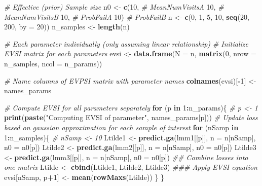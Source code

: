 \documentclass[
]{article}
\newenvironment{Shaded}{\begin{snugshade}}{\end{snugshade}}
\newcommand{\CommentTok}[1]{\textcolor[rgb]{0.56,0.35,0.01}{\textit{#1}}}
\newcommand{\ControlFlowTok}[1]{\textcolor[rgb]{0.13,0.29,0.53}{\textbf{#1}}}
\newcommand{\DataTypeTok}[1]{\textcolor[rgb]{0.13,0.29,0.53}{#1}}
\newcommand{\DecValTok}[1]{\textcolor[rgb]{0.00,0.00,0.81}{#1}}
\newcommand{\KeywordTok}[1]{\textcolor[rgb]{0.13,0.29,0.53}{\textbf{#1}}}
\newcommand{\NormalTok}[1]{#1}
\newcommand{\OperatorTok}[1]{\textcolor[rgb]{0.81,0.36,0.00}{\textbf{#1}}}
\newcommand{\StringTok}[1]{\textcolor[rgb]{0.31,0.60,0.02}{#1}}
\begin{document}
\begin{Shaded}
\begin{Highlighting}[]
\CommentTok{# Effective (prior) Sample size}
\NormalTok{n0 <-}\StringTok{ }\KeywordTok{c}\NormalTok{(}\DecValTok{10}\NormalTok{, }\CommentTok{# MeanNumVisitsA}
        \DecValTok{10}\NormalTok{, }\CommentTok{# MeanNumVisitsB}
        \DecValTok{10}\NormalTok{, }\CommentTok{# ProbFailA}
        \DecValTok{10}\NormalTok{) }\CommentTok{# ProbFailB}
\NormalTok{n <-}\StringTok{ }\KeywordTok{c}\NormalTok{(}\DecValTok{0}\NormalTok{, }\DecValTok{1}\NormalTok{, }\DecValTok{5}\NormalTok{, }\DecValTok{10}\NormalTok{, }\KeywordTok{seq}\NormalTok{(}\DecValTok{20}\NormalTok{, }\DecValTok{200}\NormalTok{, }\DataTypeTok{by =} \DecValTok{20}\NormalTok{))}
\NormalTok{n_samples <-}\StringTok{ }\KeywordTok{length}\NormalTok{(n)}

\CommentTok{# Each parameter individually (only assuming linear relationship)}
\CommentTok{# Initialize EVSI matrix for each parameters}
\NormalTok{evsi <-}\StringTok{ }\KeywordTok{data.frame}\NormalTok{(}\DataTypeTok{N =}\NormalTok{ n, }\KeywordTok{matrix}\NormalTok{(}\DecValTok{0}\NormalTok{, }\DataTypeTok{nrow =}\NormalTok{ n_samples, }\DataTypeTok{ncol =}\NormalTok{ n_params))}

\CommentTok{# Name columns of EVPSI matrix with parameter names}
\KeywordTok{colnames}\NormalTok{(evsi)[}\OperatorTok{-}\DecValTok{1}\NormalTok{] <-}\StringTok{ }\NormalTok{names_params}

\CommentTok{# Compute EVSI for all parameters separately}
\ControlFlowTok{for}\NormalTok{ (p }\ControlFlowTok{in} \DecValTok{1}\OperatorTok{:}\NormalTok{n_params)\{ }\CommentTok{# p <- 1}
  \KeywordTok{print}\NormalTok{(}\KeywordTok{paste}\NormalTok{(}\StringTok{"Computing EVSI of parameter"}\NormalTok{, names_params[p]))}
    \CommentTok{# Update loss based on gaussian approximation for each sample of interest}
    \ControlFlowTok{for}\NormalTok{ (nSamp }\ControlFlowTok{in} \DecValTok{1}\OperatorTok{:}\NormalTok{n_samples)\{ }\CommentTok{# nSamp <- 10}
\NormalTok{      Ltilde1 <-}\StringTok{ }\KeywordTok{predict.ga}\NormalTok{(lmm1[[p]], }\DataTypeTok{n =}\NormalTok{ n[nSamp], }\DataTypeTok{n0 =}\NormalTok{ n0[p])}
\NormalTok{      Ltilde2 <-}\StringTok{ }\KeywordTok{predict.ga}\NormalTok{(lmm2[[p]], }\DataTypeTok{n =}\NormalTok{ n[nSamp], }\DataTypeTok{n0 =}\NormalTok{ n0[p])}
\NormalTok{      Ltilde3 <-}\StringTok{ }\KeywordTok{predict.ga}\NormalTok{(lmm3[[p]], }\DataTypeTok{n =}\NormalTok{ n[nSamp], }\DataTypeTok{n0 =}\NormalTok{ n0[p])}
      \CommentTok{## Combine losses into one matrix}
\NormalTok{      Ltilde <-}\StringTok{ }\KeywordTok{cbind}\NormalTok{(Ltilde1, Ltilde2, Ltilde3)}
      \CommentTok{### Apply EVSI equation}
\NormalTok{      evsi[nSamp, p}\OperatorTok{+}\DecValTok{1}\NormalTok{] <-}\StringTok{ }\KeywordTok{mean}\NormalTok{(}\KeywordTok{rowMaxs}\NormalTok{(Ltilde))}
\NormalTok{    \}}
\NormalTok{\}}


\end{Highlighting}
\end{Shaded}
\end{document}
